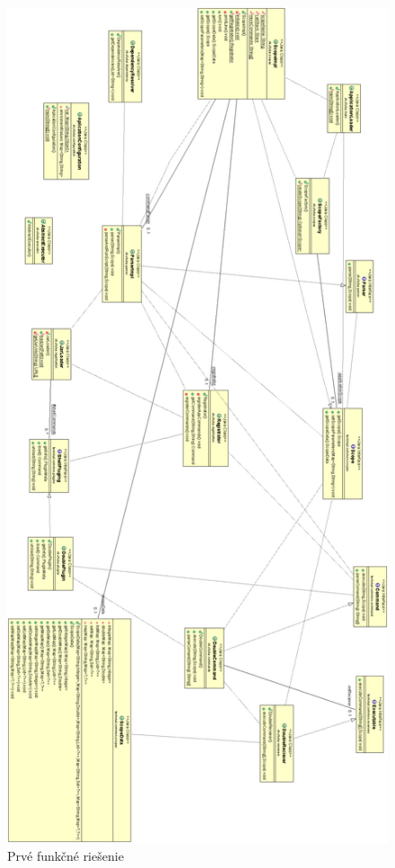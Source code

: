 { \begin{figure}[H]
	\centering
	\includegraphics[height=\textheight]{img/first_attemp_class_diag.jpg}
	\caption{Prvé funkčné riešenie}
	\label{fig:test}
\end{figure}

}
